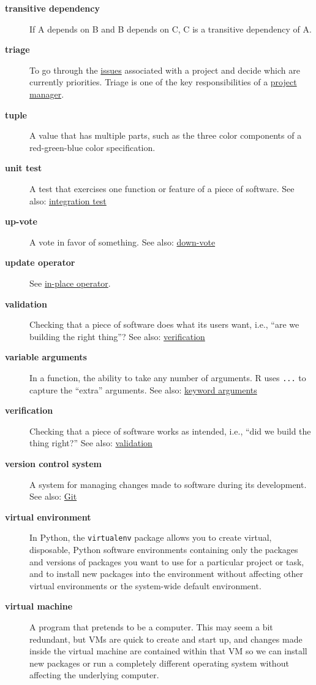 \documentclass[
]{krantz}
\begin{document}
\begin{description}
\item[\textbf{transitive dependency}]
If A depends on B and B depends on C, C is a transitive dependency of A.
\item[\textbf{triage}]
To go through the \protect\hyperlink{issue}{issues} associated with a project and decide which are currently priorities. Triage is one of the key responsibilities of a \protect\hyperlink{project_manager}{project manager}.
\item[\textbf{tuple}]
A value that has multiple parts, such as the three color components of a red-green-blue color specification.
\item[\textbf{unit test}]
A test that exercises one function or feature of a piece of software. See also: \protect\hyperlink{integration_test}{integration test}
\item[\textbf{up-vote}]
A vote in favor of something. See also: \protect\hyperlink{down_vote}{down-vote}
\item[\textbf{update operator}]
See \protect\hyperlink{in_place_operator}{in-place operator}.
\item[\textbf{validation}]
Checking that a piece of software does what its users want, i.e., ``are we building the right thing''? See also: \protect\hyperlink{verification}{verification}
\item[\textbf{variable arguments}]
In a function, the ability to take any number of arguments. R uses \texttt{...} to capture the ``extra'' arguments. See also: \protect\hyperlink{keyword_arguments}{keyword arguments}
\item[\textbf{verification}]
Checking that a piece of software works as intended, i.e., ``did we build the thing right?'' See also: \protect\hyperlink{validation}{validation}
\item[\textbf{version control system}]
A system for managing changes made to software during its development. See also: \protect\hyperlink{git}{Git}
\item[\textbf{virtual environment}]
In Python, the \texttt{virtualenv} package allows you to create virtual, disposable, Python software environments containing only the packages and versions of packages you want to use for a particular project or task, and to install new packages into the environment without affecting other virtual environments or the system-wide default environment.
\item[\textbf{virtual machine}]
A program that pretends to be a computer. This may seem a bit redundant, but VMs are quick to create and start up, and changes made inside the virtual machine are contained within that VM so we can install new packages or run a completely different operating system without affecting the underlying computer.

\end{description}
\end{document}
